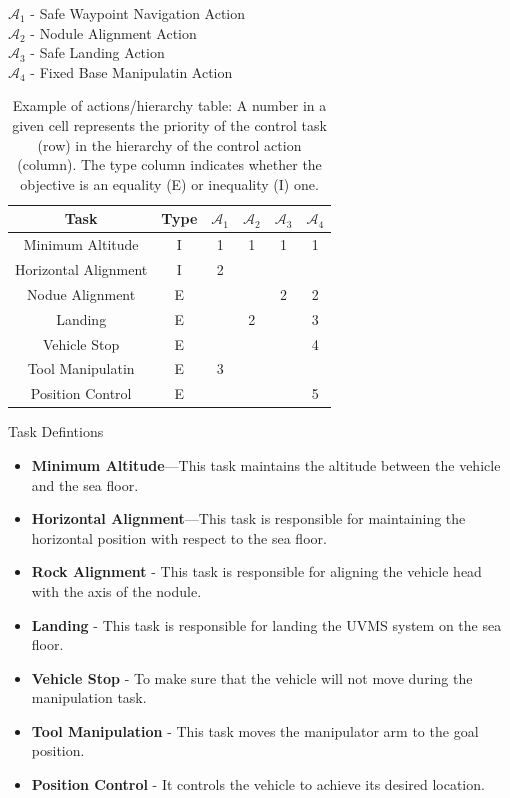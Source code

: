 \documentclass{article}
\begin{document}
\noindent
$\mathcal{A}_{1}$ - Safe Waypoint Navigation Action \\
$\mathcal{A}_{2}$ - Nodule Alignment Action \\
$\mathcal{A}_{3}$ - Safe Landing Action \\
$\mathcal{A}_{4}$ - Fixed Base Manipulatin Action
\begin{table}[htb]
	\label{tbl:actions_tables}
	\begin{center}
		\footnotesize
		\begin{tabular}{cccccc}
			\toprule		
			Task & Type & $\mathcal{A}_{1}$ & $\mathcal{A}_{2}$  & $\mathcal{A}_{3}$  & $\mathcal{A}_{4}$ \\
			\midrule
			Minimum Altitude                    & I & 1 & 1 & 1 & 1  \\
			\hdashline
			Horizontal Alignment                & I & 2 &  & &  \\
			\hdashline
			Nodue Alignment                       & E &   &  & 2 & 2   \\
			\hdashline
			Landing 						& E & & 2 & & 3 \\
			\hdashline 
			Vehicle Stop 						& E & & & & 4 \\ 
			\hdashline 
			Tool Manipulatin					& E & 3 & & & \\
			\hdashline 
			Position Control 						& E & & & & 5 \\ 
			
			\bottomrule
		\end{tabular}
	\end{center}
\caption{Example of actions/hierarchy table: A number in a given cell represents the priority of the control task (row) in the hierarchy of the control action (column). The type column indicates whether the objective is an equality (E) or inequality (I) one.}
\end{table}

\noindent
Task Defintions
\begin{itemize}
	\item \textbf{Minimum Altitude}—This task maintains the altitude between the vehicle and the sea floor.
	\item \textbf{Horizontal Alignment}—This task is responsible for maintaining the horizontal position with respect to the sea floor. 
	\item \textbf{Rock Alignment} - This task is responsible for aligning the vehicle head with the axis of the nodule. 
	\item \textbf{Landing} - This task is responsible for landing the UVMS system on the sea floor. 
	\item \textbf{Vehicle Stop} - To make sure that the vehicle will not move during the manipulation task. 
	\item \textbf{Tool Manipulation} - This task moves the manipulator arm to the goal position.
	\item \textbf{Position Control} - It controls the vehicle to achieve its desired location.
\end{itemize}
\end{document}
